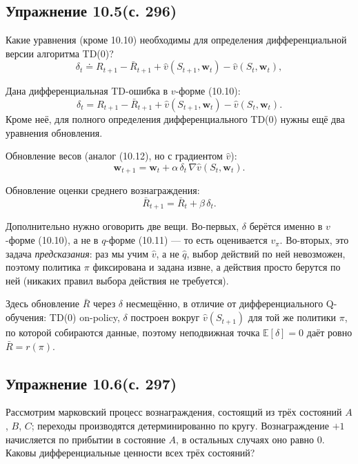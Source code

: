 \subsection{Упражнение 10.5(с. 296)}
Какие уравнения (кроме 10.10) необходимы для определения дифференциальной версии алгоритма TD(0)?
\begin{equation}
    \delta_t \doteq R_{t+1} - \bar R_{t+1} + \hat v(S_{t+1}, \mathbf w_t) - \hat v(S_t, \mathbf w_t),
    \tag{10.10}
\end{equation}
\begin{solution}
    Дана дифференциальная TD-ошибка в $v$-форме (10.10):
    \begin{equation*}
        \delta_t = R_{t+1} - \bar R_{t+1} + \hat v(S_{t+1},\mathbf w_t) - \hat v(S_t,\mathbf w_t).
    \end{equation*}
    Кроме неё, для полного определения дифференциального TD(0) нужны ещё два
    уравнения обновления.

    Обновление весов (аналог (10.12), но с градиентом $\hat v$):
    \begin{equation*}
        \mathbf w_{t+1} = \mathbf w_t + \alpha\,\delta_t\,\nabla\hat v(S_t,\mathbf w_t).
    \end{equation*}

    Обновление оценки среднего вознаграждения:
    \begin{equation*}
        \bar R_{t+1} = \bar R_t + \beta\,\delta_t.
    \end{equation*}

    Дополнительно нужно оговорить две вещи. Во-первых, $\delta$ берётся именно в
    $v$-форме (10.10), а не в $q$-форме (10.11) --- то есть оценивается $v_\pi$.
    Во-вторых, это задача \emph{предсказания}: раз мы учим $\hat v$, а не $\hat q$,
    выбор действий по ней невозможен, поэтому политика $\pi$ фиксирована и задана
    извне, а действия просто берутся по ней (никаких правил выбора действия не
    требуется).

    Здесь обновление $\bar R$ через $\delta$ несмещённо, в отличие от
    дифференциального Q-обучения: TD(0) on-policy, $\delta$ построен вокруг $\hat
    v(S_{t+1})$ для той же политики $\pi$, по которой собираются данные, поэтому
    неподвижная точка $\mathbb E[\delta]=0$ даёт ровно $\bar R = r(\pi)$.
\end{solution}

\subsection{Упражнение 10.6(с. 297)}
Рассмотрим марковский процесс вознаграждения, состоящий из трёх состояний $A$, $B$, $C$; переходы производятся детерминированно по кругу. Вознаграждение $+1$ начисляется по прибытии в состояние $A$, в остальных случаях оно равно $0$. Каковы дифференциальные ценности всех трёх состояний?

